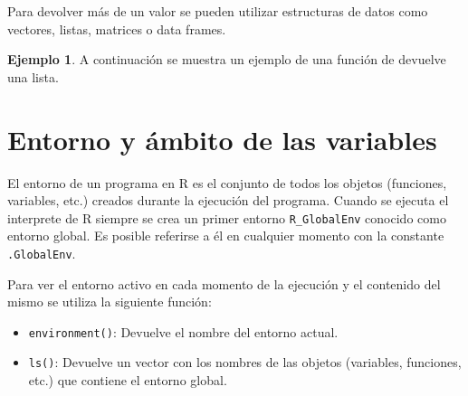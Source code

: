 \documentclass[
]{book}
\newenvironment{Shaded}{\begin{snugshade}}{\end{snugshade}}
\newcommand{\AttributeTok}[1]{\textcolor[rgb]{0.77,0.63,0.00}{#1}}
\newcommand{\CommentTok}[1]{\textcolor[rgb]{0.56,0.35,0.01}{\textit{#1}}}
\newcommand{\ControlFlowTok}[1]{\textcolor[rgb]{0.13,0.29,0.53}{\textbf{#1}}}
\newcommand{\DecValTok}[1]{\textcolor[rgb]{0.00,0.00,0.81}{#1}}
\newcommand{\FunctionTok}[1]{\textcolor[rgb]{0.00,0.00,0.00}{#1}}
\newcommand{\NormalTok}[1]{#1}
\newcommand{\OtherTok}[1]{\textcolor[rgb]{0.56,0.35,0.01}{#1}}
\newcommand{\SpecialCharTok}[1]{\textcolor[rgb]{0.00,0.00,0.00}{#1}}
\providecommand{\tightlist}{%
  \setlength{\itemsep}{0pt}\setlength{\parskip}{0pt}}
\theoremstyle{definition}
\theoremstyle{definition}
\newtheorem{example}{Ejemplo}[chapter]
\theoremstyle{definition}
\theoremstyle{definition}
\theoremstyle{remark}
\begin{document}
Para devolver más de un valor se pueden utilizar estructuras de datos como vectores, listas, matrices o data frames.

\begin{example}

A continuación se muestra un ejemplo de una función de devuelve una lista.

\begin{Shaded}
\end{Shaded}

\end{example}

\hypertarget{entorno-y-uxe1mbito-de-las-variables}{%
\section{Entorno y ámbito de las variables}\label{entorno-y-uxe1mbito-de-las-variables}}

El entorno de un programa en R es el conjunto de todos los objetos (funciones, variables, etc.) creados durante la ejecución del programa. Cuando se ejecuta el interprete de R siempre se crea un primer entorno \texttt{R\_GlobalEnv} conocido como entorno global. Es posible referirse a él en cualquier momento con la constante \texttt{.GlobalEnv}.

Para ver el entorno activo en cada momento de la ejecución y el contenido del mismo se utiliza la siguiente función:

\begin{itemize}
\tightlist
\item
  \texttt{environment()}: Devuelve el nombre del entorno actual.
\item
  \texttt{ls()}: Devuelve un vector con los nombres de las objetos (variables, funciones, etc.) que contiene el entorno global.
\end{itemize}
\end{document}
